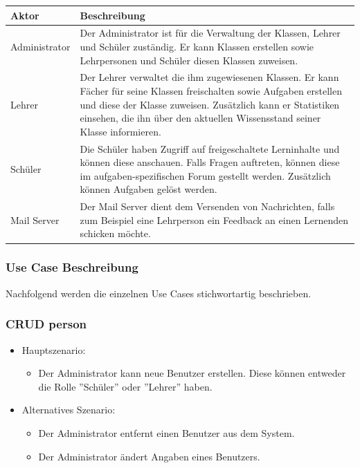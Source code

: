 \begin{table}[H]
	\centering
	\begin{tabu} to 0.9\textwidth {l X}
	\toprule
	Aktor & Beschreibung \\ 
	\midrule
	Administrator & Der Administrator ist für die Verwaltung der Klassen, Lehrer und Schüler zuständig. Er kann Klassen erstellen sowie Lehrpersonen und Schüler diesen Klassen zuweisen. \\
	\midrule
	Lehrer & Der Lehrer verwaltet die ihm zugewiesenen Klassen. Er kann Fächer für seine Klassen freischalten sowie Aufgaben erstellen und diese der Klasse zuweisen. Zusätzlich kann er Statistiken einsehen, die ihn über den aktuellen Wissensstand seiner Klasse informieren. \\
	\midrule
	Schüler & Die Schüler haben Zugriff auf freigeschaltete Lerninhalte und können diese anschauen. Falls Fragen auftreten, können diese im aufgaben-spezifischen Forum gestellt werden. Zusätzlich können Aufgaben gelöst werden. \\
	\midrule
	Mail Server & Der Mail Server dient dem Versenden von Nachrichten, falls zum Beispiel eine Lehrperson ein Feedback an einen Lernenden schicken möchte. \\
	\bottomrule
	\end{tabu}
	\label{aktoren}
\end{table}


\subsubsection{Use Case Beschreibung}
Nachfolgend werden die einzelnen Use Cases stichwortartig beschrieben. 
\subsubsection*{CRUD person}

\begin{itemize}
	\item Hauptszenario:
	\begin{itemize}
		\item Der Administrator kann neue Benutzer erstellen. Diese können entweder die Rolle ''Schüler'' oder ''Lehrer'' haben.
	\end{itemize}
	\item Alternatives Szenario:
	\begin{itemize}
		\item Der Administrator entfernt einen Benutzer aus dem System.
		\item Der Administrator ändert Angaben eines Benutzers.
	\end{itemize}
\end{itemize}

